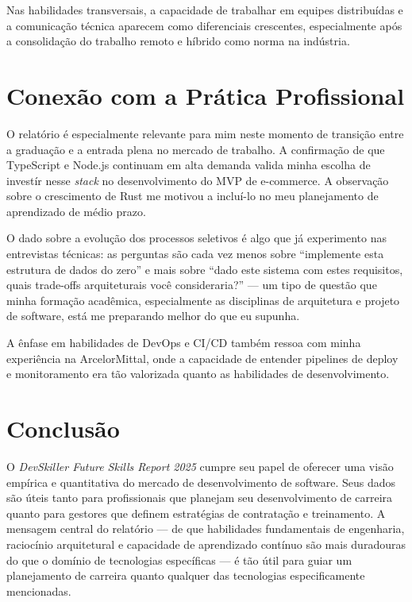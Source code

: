 \documentclass[12pt,a4paper]{article}
\begin{document}
Nas habilidades transversais, a capacidade de trabalhar em equipes distribu\'idas
e a comunica\c{c}\~ao t\'ecnica aparecem como diferenciais crescentes, especialmente
ap\'os a consolida\c{c}\~ao do trabalho remoto e h\'ibrido como norma na ind\'ustria.

\section{Conex\~ao com a Pr\'atica Profissional}

O relat\'orio \'e especialmente relevante para mim neste momento de transi\c{c}\~ao
entre a gradua\c{c}\~ao e a entrada plena no mercado de trabalho. A confirma\c{c}\~ao
de que TypeScript e Node.js continuam em alta demanda valida minha escolha de
invest\'ir nesse \textit{stack} no desenvolvimento do MVP de e-commerce. A
observa\c{c}\~ao sobre o crescimento de Rust me motivou a inclu\'i-lo no meu
planejamento de aprendizado de m\'edio prazo.

O dado sobre a evolu\c{c}\~ao dos processos seletivos \'e algo que j\'a experimento
nas entrevistas t\'ecnicas: as perguntas s\~ao cada vez menos sobre ``implemente
esta estrutura de dados do zero'' e mais sobre ``dado este sistema com estes
requisitos, quais trade-offs arquiteturais voc\^e consideraria?'' --- um tipo de
quest\~ao que minha forma\c{c}\~ao acad\^emica, especialmente as disciplinas de
arquitetura e projeto de software, est\'a me preparando melhor do que eu supunha.

A \^enfase em habilidades de DevOps e CI/CD tamb\'em ressoa com minha experi\^encia
na ArcelorMittal, onde a capacidade de entender pipelines de deploy e monitoramento
era t\~ao valorizada quanto as habilidades de desenvolvimento.

\section{Conclus\~ao}

O \textit{DevSkiller Future Skills Report 2025} cumpre seu papel de oferecer uma
vis\~ao emp\'irica e quantitativa do mercado de desenvolvimento de software. Seus
dados s\~ao \'uteis tanto para profissionais que planejam seu desenvolvimento de
carreira quanto para gestores que definem estrat\'egias de contrata\c{c}\~ao e
treinamento. A mensagem central do relat\'orio --- de que habilidades fundamentais
de engenharia, racioc\'inio arquitetural e capacidade de aprendizado cont\'inuo
s\~ao mais duradouras do que o dom\'inio de tecnologias espec\'ificas --- \'e
t\~ao \'util para guiar um planejamento de carreira quanto qualquer das tecnologias
especificamente mencionadas.
\end{document}
